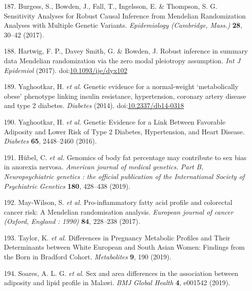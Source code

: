 \documentclass[11pt,twoside]{bristolthesis}
\begin{document}
\leavevmode\hypertarget{ref-Burgess2017a}{}%
187. Burgess, S., Bowden, J., Fall, T., Ingelsson, E. \& Thompson, S. G. Sensitivity Analyses for Robust Causal Inference from Mendelian Randomization Analyses with Multiple Genetic Variants. \emph{Epidemiology (Cambridge, Mass.)} \textbf{28}, 30--42 (2017).

\leavevmode\hypertarget{ref-Hartwig2017}{}%
188. Hartwig, F. P., Davey Smith, G. \& Bowden, J. Robust inference in summary data Mendelian randomization via the zero modal pleiotropy assumption. \emph{Int J Epidemiol} (2017). doi:\href{https://doi.org/10.1093/ije/dyx102}{10.1093/ije/dyx102}

\leavevmode\hypertarget{ref-Yaghootkar2014}{}%
189. Yaghootkar, H. \emph{et al.} Genetic evidence for a normal-weight `metabolically obese' phenotype linking insulin resistance, hypertension, coronary artery disease and type 2 diabetes. \emph{Diabetes} (2014). doi:\href{https://doi.org/10.2337/db14-0318}{10.2337/db14-0318}

\leavevmode\hypertarget{ref-Yaghootkar2016}{}%
190. Yaghootkar, H. \emph{et al.} Genetic Evidence for a Link Between Favorable Adiposity and Lower Risk of Type 2 Diabetes, Hypertension, and Heart Disease. \emph{Diabetes} \textbf{65}, 2448--2460 (2016).

\leavevmode\hypertarget{ref-Hubel2019}{}%
191. Hübel, C. \emph{et al.} Genomics of body fat percentage may contribute to sex bias in anorexia nervosa. \emph{American journal of medical genetics. Part B, Neuropsychiatric genetics : the official publication of the International Society of Psychiatric Genetics} \textbf{180}, 428--438 (2019).

\leavevmode\hypertarget{ref-May-Wilson2017}{}%
192. May-Wilson, S. \emph{et al.} Pro-inflammatory fatty acid profile and colorectal cancer risk: A Mendelian randomisation analysis. \emph{European journal of cancer (Oxford, England : 1990)} \textbf{84}, 228--238 (2017).

\leavevmode\hypertarget{ref-Taylor2019}{}%
193. Taylor, K. \emph{et al.} Differences in Pregnancy Metabolic Profiles and Their Determinants between White European and South Asian Women: Findings from the Born in Bradford Cohort. \emph{Metabolites} \textbf{9}, 190 (2019).

\leavevmode\hypertarget{ref-Soares2019}{}%
194. Soares, A. L. G. \emph{et al.} Sex and area differences in the association between adiposity and lipid profile in Malawi. \emph{BMJ Global Health} \textbf{4}, e001542 (2019).
\end{document}
